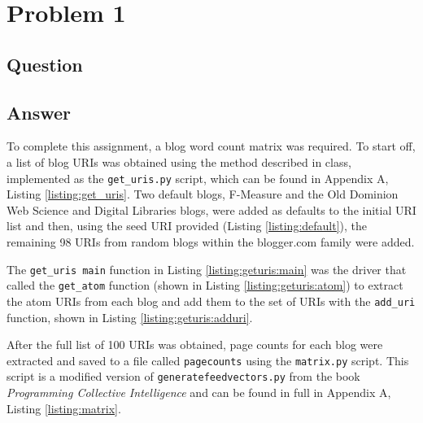 \section{Problem 1}

\subsection{Question}


\subsection{Answer}
To complete this assignment, a blog word count matrix was required. To start off, a list of blog URIs was obtained using the method described in class, implemented as the {\tt get\_uris.py} script, which can be found in Appendix A, Listing \ref{listing:get_uris}. Two default blogs, F-Measure and the Old Dominion Web Science and Digital Libraries blogs, were added as defaults to the initial URI list and then, using the seed URI provided (Listing \ref{listing:default}), the remaining 98 URIs from random blogs within the blogger.com family were added.
\vspace{2mm}


The {\tt get\_uris main} function in Listing \ref{listing:geturis:main} was the driver that called the {\tt get\_atom} function (shown in Listing \ref{listing:geturis:atom}) to extract the atom \cite{atom} URIs from each blog and add them to the set of URIs with the {\tt add\_uri} function, shown in Listing \ref{listing:geturis:adduri}.


\clearpage








After the full list of 100 URIs was obtained, page counts for each blog were extracted and saved to a file called {\tt pagecounts} using the {\tt matrix.py} script. This script is a modified version of {\tt generatefeedvectors.py} from the book {\it Programming Collective Intelligence} \cite{pci} and can be found in full in Appendix A, Listing \ref{listing:matrix}. 

